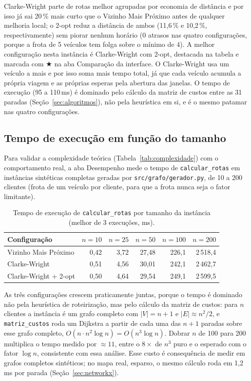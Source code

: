 \documentclass[12pt]{article}
\begin{document}
Clarke-Wright parte de rotas melhor agrupadas por economia de distância e por isso já
sai 20\,\% mais curto que o Vizinho Mais Próximo antes de qualquer melhoria local; o
2-opt reduz a distância de ambos (11,6\,\% e 10,2\,\%, respectivamente) sem piorar
nenhum horário (0 atrasos nas quatro configurações, porque a frota de 5 veículos tem
folga sobre o mínimo de 4). A melhor configuração nesta instância é Clarke-Wright com
2-opt, destacada na tabela e marcada com $\bigstar$ na aba Comparação da interface. O
Clarke-Wright usa um veículo a mais e por isso soma mais tempo total, já que cada
veículo acumula a própria viagem e as próprias esperas pela abertura das janelas. O
tempo de execução (95 a 110\,ms) é dominado pelo cálculo da matriz de custos entre as 31
paradas (Seção~\ref{sec:algoritmos}), não pela heurística em si, e é o mesmo patamar nas
quatro configurações.

\subsection{Tempo de execução em função do tamanho}

Para validar a complexidade teórica (Tabela~\ref{tab:complexidade}) com o comportamento
real, a aba Desempenho mede o tempo de \texttt{calcular\_rotas} em instâncias sintéticas
completas geradas por \texttt{src/grafo/gerador.py}, de 10 a 200 clientes (frota de um
veículo por cliente, para que a frota nunca seja o fator limitante).

\begin{table}[htbp]
\centering
\caption{Tempo de execução de \texttt{calcular\_rotas} por tamanho da instância (melhor de 3 execuções, ms).}
\label{tab:desempenho}
\begin{tabular}{lrrrrr}
\toprule
Configuração & $n=10$ & $n=25$ & $n=50$ & $n=100$ & $n=200$ \\
\midrule
Vizinho Mais Próximo   & 0{,}42 & 3{,}72 & 27{,}48 & 226{,}1 & 2\,518{,}4 \\
Clarke-Wright          & 0{,}51 & 4{,}56 & 30{,}01 & 242{,}1 & 2\,462{,}7 \\
Clarke-Wright + 2-opt  & 0{,}50 & 4{,}64 & 29{,}54 & 249{,}1 & 2\,599{,}5 \\
\bottomrule
\end{tabular}
\end{table}

As três configurações crescem praticamente juntas, porque o tempo é dominado não pela
heurística de roteirização, mas pelo cálculo da matriz de custos: para $n$ clientes a
instância é um grafo completo com $|V| = n+1$ e $|E| \approx n^2/2$, e
\texttt{matriz\_custos} roda um Dijkstra a partir de cada uma das $n+1$ paradas sobre
esse grafo completo, $O(n \cdot n^2 \log n) = O(n^3 \log n)$. Dobrar $n$ de 100 para 200
multiplica o tempo medido por $\approx 11$, entre o $8\times$ de $n^3$ puro e o esperado
com o fator $\log n$, consistente com essa análise. Esse custo é consequência de medir
em grafos completos sintéticos; no mapa real, esparso, o mesmo cálculo roda em 1,2\,ms
por parada (Seção~\ref{sec:networkx}).
\end{document}
